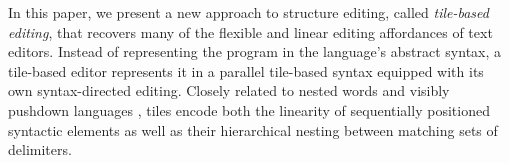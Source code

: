 In this paper, we present a new approach to structure
editing, called \emph{tile-based editing}, that
recovers many of the flexible and linear editing
affordances of text editors.
Instead of representing the program in the language's
abstract syntax, a tile-based editor represents it
in a parallel tile-based syntax equipped with its own
syntax-directed editing.
Closely related to nested words \cite{nested-words}
and visibly pushdown languages \cite{visibly-pushdown-langs},
tiles encode both the linearity of sequentially
positioned syntactic elements as well as
their hierarchical nesting between matching sets
of delimiters.




